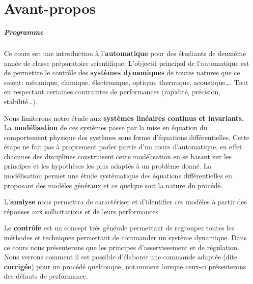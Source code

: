 \chapter*{Avant-propos}
\thispagestyle{plain}
\paragraph{Programme}
Ce cours est une introduction à l'\textbf{automatique}
pour des étudiants de deuxième année de classe préparatoire scientifique.
L'objectif principal de l'automatique est de permettre
le contrôle des \textbf{systèmes dynamiques}
de toutes natures que ce soient: mécanique, chimique, 
électronique, optique, thermique, acoustique\ldots.
Tout en respectant certaines contraintes de performances 
(rapidité, précision, stabilité\ldots).

Nous limiterons notre étude aux \textbf{systèmes linéaires continus et 
invariants.} La \textbf{modélisation} de ces systèmes passe par la mise 
en équation du comportement physique des systèmes sous forme d'équations 
différentielles. Cette étape ne fait pas à proprement parler partie d'un 
cours d'automatique, en effet chacunes des disciplines construisent cette 
modélisation en se basant sur les principes et les hypothèses les plus 
adaptés à un problème donné.
La modélisation permet une étude systématique des équations différentielles 
en proposant des modèles généraux et ce quelque soit la nature du procédé.

L'\textbf{analyse} nous permettra de caractériser et d'identifier 
ces modèles à partir des réponses aux sollicitations et de leurs performances.

Le \textbf{contrôle} est un concept très générale permettant de regrouper
toutes les méthodes et techniques permettant de commander un système dynamique.
Dans ce cours nous présenterons que les principes d'asservissement et de 
régulation. Nous verrons comment il est possible d'élaborer une commande 
adaptée (dite \textbf{corrigée}) pour un procédé quelconque, notamment 
lorsque ceux-ci présenterons des défauts de performance.

